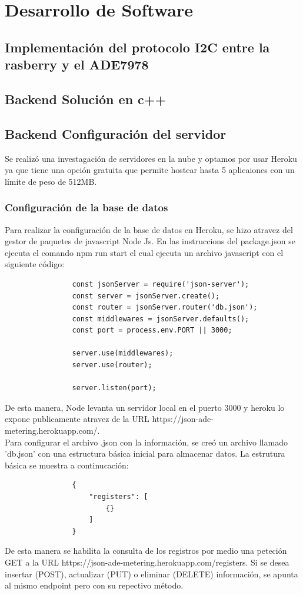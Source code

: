 \section{Desarrollo de Software}
    
    \subsection{Implementación del protocolo I2C entre la rasberry y el ADE7978}
    \subsection{Backend Solución en c++}
    \subsection{Backend Configuración del servidor}
        Se realizó una investagación de servidores en la nube y optamos por usar Heroku ya que tiene una opción gratuita que permite hostear hasta 5 aplicaiones con un límite de peso de 512MB. 
        \subsubsection{Configuraci\'on de la base de datos}
            Para realizar la configuración de la base de datos en Heroku, se hizo atravez del gestor de paquetes de javascript Node Js. En las instruccions del package.json se ejecuta el comando npm run start el cual ejecuta un archivo javascript con el siguiente código:

            \begin{lstlisting}
                const jsonServer = require('json-server');
                const server = jsonServer.create();
                const router = jsonServer.router('db.json');
                const middlewares = jsonServer.defaults();
                const port = process.env.PORT || 3000;
            
                server.use(middlewares);
                server.use(router);
            
                server.listen(port);
            \end{lstlisting}
            De esta manera, Node levanta un servidor local en el puerto 3000 y heroku lo expone publicamente atravez de la URL https://json-ade-metering.herokuapp.com/.\\
            Para configurar el archivo .json con la información, se creó un archivo llamado 'db.json' con una estructura básica inicial para almacenar datos. La estrutura básica se muestra a continucación:\\
            \begin{lstlisting}
                {
                    "registers": [
                        {}
                    ]
                }
            \end{lstlisting}
            De esta manera se habilita la consulta de los registros por medio una peteción GET a la URL https://json-ade-metering.herokuapp.com/registers. Si se desea insertar (POST), actualizar (PUT) o eliminar (DELETE) información, se apunta al mismo endpoint pero con su repectivo método.


